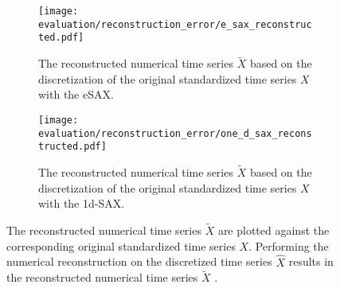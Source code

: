 \newpage
\begin{figure}
\centering
\begin{subfigure}[t]{0.8\textwidth}
\texttt{[image: evaluation/reconstruction\_error/e\_sax\_reconstructed.pdf]}
\caption{The reconstructed numerical time series $\tilde{X}$ based on the discretization of the original standardized time series $X$ with the \ac{eSAX}.}
\label{fig:e_sax_reconstructed}
\end{subfigure}
\par \bigskip
\begin{subfigure}[t]{0.8\textwidth}
\texttt{[image: evaluation/reconstruction\_error/one\_d\_sax\_reconstructed.pdf]}
\caption{The reconstructed numerical time series $\tilde{X}$ based on the discretization of the original standardized time series $X$ with the \ac{1d-SAX}.}
\label{fig:one_d_sax_reconstructed}
\end{subfigure}
\caption[Reconstruction Error - Numerical Reconstruction based on the eSAX and 1d-SAX]{The reconstructed numerical time series $\tilde{X}$ are plotted against the corresponding original standardized time series $X$. Performing the numerical reconstruction on the discretized time series $\hat{X}$ results in the reconstructed numerical time series $\tilde{X}$ \cite{APCA}.}
\label{fig:reconstructed_e_sax_one_d_sax}
\end{figure}
